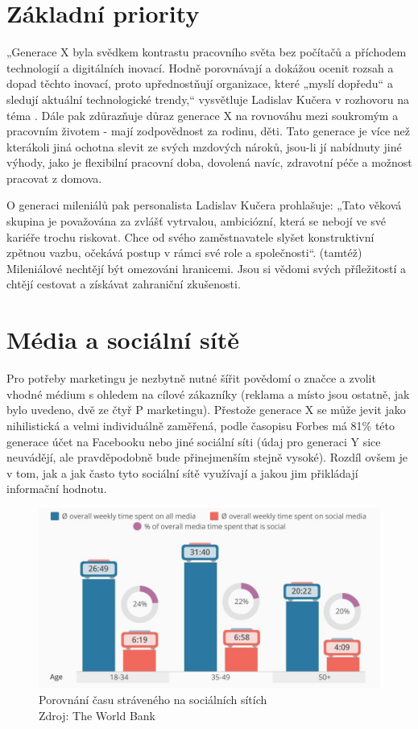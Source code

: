\section{Základní priority}
„Generace X byla svědkem kontrastu pracovního světa bez počítačů a příchodem technologií a digitálních inovací. Hodně porovnávají a dokážou ocenit rozsah a dopad těchto inovací, proto upřednostňují organizace, které „myslí dopředu“ a sledují aktuální technologické trendy,“ vysvětluje Ladislav Kučera v rozhovoru na téma .\cite{idnes2018generacezamestancu} Dále pak zdůrazňuje důraz generace X na rovnováhu mezi soukromým a pracovním životem - mají zodpovědnost za rodinu, děti. Tato generace je více než kterákoli jiná ochotna slevit ze svých mzdových nároků, jsou-li jí nabídnuty jiné výhody, jako je flexibilní pracovní doba, dovolená navíc, zdravotní péče a možnost pracovat z domova.

O generaci mileniálů pak personalista Ladislav Kučera prohlašuje: „Tato věková skupina je považována za zvlášť vytrvalou, ambiciózní, která se nebojí ve své kariéře trochu riskovat. Chce od svého zaměstnavatele slyšet konstruktivní zpětnou vazbu, očekává postup v rámci své role a společnosti“. (tamtéž)
Mileniálové nechtějí být omezováni hranicemi. Jsou si vědomi svých příležitostí a chtějí cestovat a získávat zahraniční zkušenosti.

\section{Média a sociální sítě}
Pro potřeby marketingu je nezbytně nutné šířit povědomí o značce a zvolit vhodné médium s ohledem na cílové zákazníky (reklama a místo jsou ostatně, jak bylo uvedeno, dvě ze čtyř P marketingu).
Přestože generace X se může jevit jako nihilistická a velmi individuálně zaměřená, podle časopisu Forbes má 81\rm \% této generace účet na Facebooku nebo jiné sociální síti\cite{forbes2019generationX} (údaj pro generaci Y sice neuvádějí, ale pravděpodobně bude přinejmenším stejně vysoké). Rozdíl ovšem je v tom, jak a jak často tyto sociální sítě využívají a jakou jim přikládají informační hodnotu.


\medskip
\begin{figure}[htbp!]
    \centering
    \includegraphics[width=.88\textwidth]{assets/gen-xy-time-spend-on-social-media.png}
    \caption[Porovnání času stráveného na sociálních sítích]{Porovnání času stráveného na sociálních sítích \\ Zdroj: The World Bank\protect\footnotemark }
    \label{fig:cas-na-socialnich-sitich}
\end{figure}


